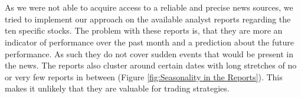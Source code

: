 \\ \\
As we were not able to acquire access to a reliable and precise news sources, we tried to implement our approach on the available analyst reports regarding the ten specific stocks. The problem with these reports is, that they are more an indicator of performance over the past month and a prediction about the future performance. As such they do not cover sudden events that would be present in the news. The reports also cluster around certain dates with long stretches of no or very few reports in between (Figure \ref{fig:Seasonality in the Reports}). This makes it unlikely that they are valuable for trading strategies.
%    
\\  \\
